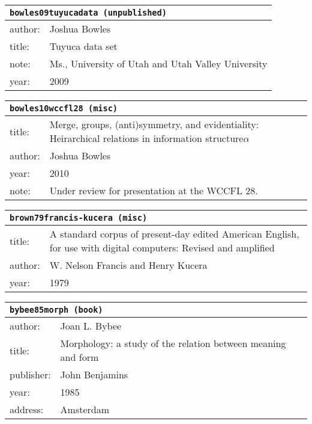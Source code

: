 \documentclass{article}
\begin{document}
\bigskip

\begin{tabular}{p{}p{}}
\multicolumn{2}{l}{\texttt{bowles09tuyucadata (unpublished)}}\\
\hline
author: & Joshua Bowles\\
title: & Tuyuca data set\\
note: & \textsc{M}s., University of Utah and Utah Valley University\\
year: & 2009\\
\end{tabular}

\bigskip

\begin{tabular}{p{}p{}}
\multicolumn{2}{l}{\texttt{bowles10wccfl28 (misc)}}\\
\hline
title: & \textsc{M}erge, groups, (anti)symmetry, and evidentiality: Heirarchical relations in information structure$\alpha$\\
author: & Joshua Bowles\\
year: & 2010\\
note: & \textsc{U}nder review for presentation at the \textsc{WCCFL 28}.\\
\end{tabular}

\bigskip

\begin{tabular}{p{}p{}}
\multicolumn{2}{l}{\texttt{brown79francis-kucera (misc)}}\\
\hline
title: & A standard corpus of present-day edited \textsc{A}merican \textsc{E}nglish, for use with digital computers: Revised and amplified\\
author: & W. Nelson Francis and Henry Kucera\\
year: & 1979\\
\end{tabular}

\bigskip

\begin{tabular}{p{}p{}}
\multicolumn{2}{l}{\texttt{bybee85morph (book)}}\\
\hline
author: & Joan L. Bybee\\
title: & Morphology: a study of the relation between meaning and form\\
publisher: & John Benjamins\\
year: & 1985\\
address: & Amsterdam\\
\end{tabular}
\end{document}
